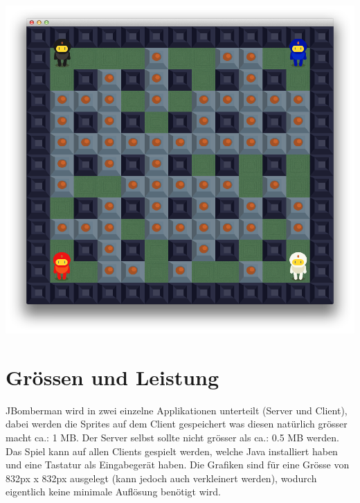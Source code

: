 \documentclass[11pt]{scrartcl}
\begin{document}
\includegraphics[scale=0.45]{GameFrame}

\section{Grössen und Leistung}
JBomberman wird in zwei einzelne Applikationen unterteilt (Server und Client), dabei werden 
die Sprites auf dem Client gespeichert was diesen natürlich grösser macht ca.: 1 MB. 
Der Server selbst sollte nicht grösser als ca.: 0.5 MB werden.
Das Spiel kann auf allen Clients gespielt werden, welche Java installiert haben 
und eine Tastatur als Eingabegerät haben.
Die Grafiken sind für eine Grösse von 832px x 832px ausgelegt (kann jedoch auch 
verkleinert werden),
 wodurch eigentlich keine minimale Auflösung benötigt wird.
\end{document}
